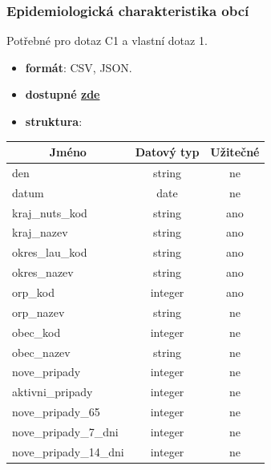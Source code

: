 \documentclass[12pt]{article}
\begin{document}
\subsubsection*{Epidemiologická charakteristika obcí}        
Potřebné pro dotaz C1 a vlastní dotaz 1.
\begin{itemize}
    \item \textbf{formát}: CSV, JSON.
    \item \textbf{dostupné  \href{https://onemocneni-aktualne.mzcr.cz/api/v2/covid-19/obce.csv}{zde}}
    \item \textbf{struktura}:
\end{itemize}
        \begin{center}
            \begin{tabular}{ |l|c|c| } 
                \hline
                \multicolumn{1}{|c|}{Jméno} & Datový typ & Užitečné \\
                \hline
                \hline
                den & string & ne \\ 
                \hline
                datum & date & ne \\ 
                \hline
                kraj\_nuts\_kod & string & ano \\ 
                \hline
                kraj\_nazev & string & ano \\ 
                \hline
                okres\_lau\_kod & string & ano \\ 
                \hline
                okres\_nazev & string & ano \\ 
                \hline
                orp\_kod & integer & ano \\ 
                \hline
                orp\_nazev & string & ne \\ 
                \hline
                obec\_kod & integer & ne \\ 
                \hline
                obec\_nazev & string & ne \\ 
                \hline
                nove\_pripady & integer & ne \\ 
                \hline
                aktivni\_pripady & integer & ne \\ 
                \hline
                nove\_pripady\_65 & integer & ne \\ 
                \hline
                nove\_pripady\_7\_dni & integer & ne \\ 
                \hline
                nove\_pripady\_14\_dni & integer & ne \\ 
                \hline
            \end{tabular}
        \end{center} 
\end{document}
